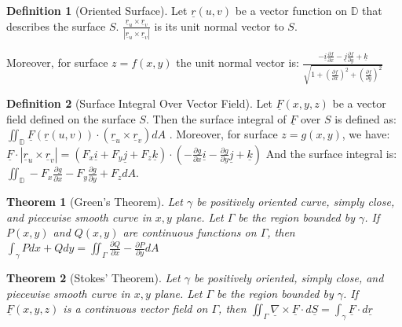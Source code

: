 \documentclass[9pt]{article}
\newtheorem{theorem}{Theorem}[subsection]
\theoremstyle{definition}
\newtheorem{definition}{Definition}[section]
\theoremstyle{remark}
\begin{document}
\begin{definition}[Oriented Surface]
	Let $\underline{r}(u,v)$ be a vector function on $\mathbb{D}$ that describes the surface $S$.
	$ \frac{\underline{r}_u \times \underline{r}_v}{| \underline{r}_u \times \underline{r}_v|}$ is its unit normal vector to $S$.

	Moreover, for surface $z = f(x,y)$ the unit normal vector is:
	$
		\frac{-\underline{i} \frac{\partial f}{\partial x} - \underline{j} \frac{\partial f}{\partial y} + \underline{k}}
		{\sqrt{1 + \left( \frac{\partial f}{\partial x} \right)^2 + \left( \frac{\partial f}{\partial y} \right)^2}}
	$
\end{definition}
\begin{definition}[Surface Integral Over Vector Field]
	Let $\underline{F}(x,y,z)$ be a vector field defined on the surface $S$.
	Then the surface integral of $\underline{F}$ over $S$ is defined as:
$
	\iint_{\mathbb{D}} \underline{F}(\underline{r}(u,v)) \cdot \left( \underline{r}_u \times \underline{r}_v \right)dA
$	
. Moreover, for surface $z = g(x,y)$, we have:
$
	\underline{F} \cdot | \underline{r}_u \times \underline{r}_v| 
=
	(F_x \underline{i} + F_y \underline{j} + F_z \underline{k}) \cdot \left( - \frac{ \partial g}{ \partial x} \underline{i} - \frac{ \partial g}{ \partial y} \underline{j} + \underline{k} \right)
$
And the surface integral is:
$
\iint _{ \mathbb{D}} - F_x \frac{ \partial g}{ \partial x} - F_y \frac{ \partial g}{ \partial y} + F_z dA.
$
\end{definition}

\begin{theorem}[Green's Theorem]
	Let $\gamma$ be positively oriented curve, simply close, and piecewise smooth curve in $x,y$ plane.
	Let $ \Gamma$ be the region bounded by $\gamma$.
	If $ P(x,y)$ and $Q(x,y)$ are continuous functions on $\Gamma$, then
$
	\int _{\gamma} P dx + Qdy = \iint _{\Gamma} \frac{\partial Q}{\partial x} - \frac{\partial P}{\partial y} dA
$

\end{theorem}

\begin{theorem}[Stokes' Theorem]
	Let $\gamma$ be positively oriented, simply close, and piecewise smooth curve in $x,y$ plane.
	Let $ \Gamma$ be the region bounded by $\gamma$.
	If $ \underline{F}(x,y, z)$ is a continuous vector field on $\Gamma$, then
$
	\iint _{\Gamma} \underline{\nabla} \times \underline{F} \cdot d\underline{S} = \int _{\gamma} \underline{F} \cdot d\underline{r}
$

\end{theorem}
\end{document}
